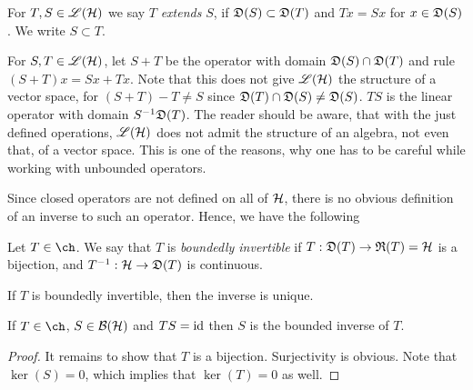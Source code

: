 \begin{defi}
  For $T, S \in \mathscr{L}(\mathcal{H})$ we say $T$ \textit{extends} $S$, if $\mathfrak{D}(S)\subset
  \mathfrak{D}(T)$ and $ Tx = Sx$ for $x \in \mathfrak{D} (S)$. We write $S \subset T$.
\end{defi}

For $S, T \in \mathscr{L}(\mathcal{H})$, let $S + T$ be the operator with domain 
$\mathfrak{D}(S) \cap \mathfrak{D}(T)$ and rule $(S + T)x = Sx + Tx$. Note that this does
not give $\mathscr{L}(\mathcal{H})$ the structure of a vector space, for 
$(S + T) - T \neq S$ since
$\mathfrak{D}(T)\cap \mathfrak{D}(S) \neq \mathfrak{D}(S)$.
$TS$ is the linear operator with domain $S^{-1} \mathfrak{D}(T)$. The reader should
be aware, that with the just defined operations, $\mathscr{L}(\mathcal{H})$ does not admit the
structure of an algebra, not even that, of a vector space. This is one
of the reasons, why one has to be careful while working with unbounded
operators. 

Since closed operators are not defined on all of $\mathcal{H}$,
there is no obvious definition of an inverse to such an operator.
Hence, we have the following

\begin{defi}
 Let $T \in \ch$. We say that $T$ is \textit{boundedly invertible} if
 $T:\mathfrak{D}(T) \to \mathfrak{R}(T)= \mathcal{H}$ is a bijection, and $T^{-1} :\mathcal{H} \to \mathfrak{D}(T)$
 is continuous.
\end{defi}

\begin{rem}
 If $T$ is boundedly invertible, then the inverse is unique.
\end{rem}

% 
% 
% 


\begin{lem}
 If $T \in \ch$, $S \in \mathcal{B}(\mathcal{H})$ and $ TS = \operatorname{id}$ then $S$ is the bounded inverse of $T$.
\end{lem}

\begin{proof}
 It remains to show that $T$ is a bijection.
 Surjectivity is obvious. Note that $\ker(S) =0$, which implies that 
 $\ker(T)=0$ as well.
 \end{proof}




% 
% 

 
















